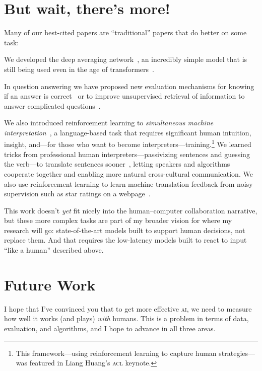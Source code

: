 \documentclass[11pt]{amsart}
\newcommand{\abr}[1]{\textsc{#1}}
\begin{document}
\section{But wait, there's more!}

Many of our best-cited papers are ``traditional'' papers that do
better on some task:
%
\begin{itemize*}
\item We developed the deep averaging network~\cite[\abr{dan}]{iyyer-15}, an
incredibly simple model that is still being used even in the age of
transformers~\cite{ye-22}.

\item In question answering we have proposed new evaluation mechanisms
  for knowing if an answer is correct~\cite{si-21} or to improve
  unsupervised retrieval of information to answer complicated
  questions~\cite{elgohary-19,zhao-20,shi-20}.

\item We also introduced reinforcement learning to \emph{simultaneous
machine interpretation}~\cite{Grissom:He:Boyd-Graber:Morgan-2014}, a
  language-based task that requires significant human intuition,
  insight, and---for those who want to become
  interpreters---training.\footnote{This framework---using
  reinforcement learning to capture human strategies---was featured in
  Liang Huang's \abr{acl} keynote.} We learned tricks from
  professional human interpreters---passivizing sentences and guessing
  the verb---to translate sentences sooner~\cite{He-15}, letting
  speakers and algorithms cooperate together and enabling more natural
  cross-cultural communication.  We also use reinforcement
  learning to learn machine translation feedback from noisy
  supervision such as star ratings on a webpage~\cite{nguyen-17}.
\end{itemize*}

This work doesn't \emph{yet} fit nicely into the human--computer
collaboration narrative, but these more complex tasks are part of my
broader vision for where my research will go: state-of-the-art models
built to support human decisions, not replace them.  And that requires
the low-latency models built to react to input ``like a human''
described above.

\section{Future Work}

I hope that I've convinced you that to get more effective \abr{ai}, we
need to measure how well it works (and plays) \emph{with} humans.
%
This is a problem in terms of data, evaluation, and algorithms, and I
hope to advance in all three areas.
\end{document}
